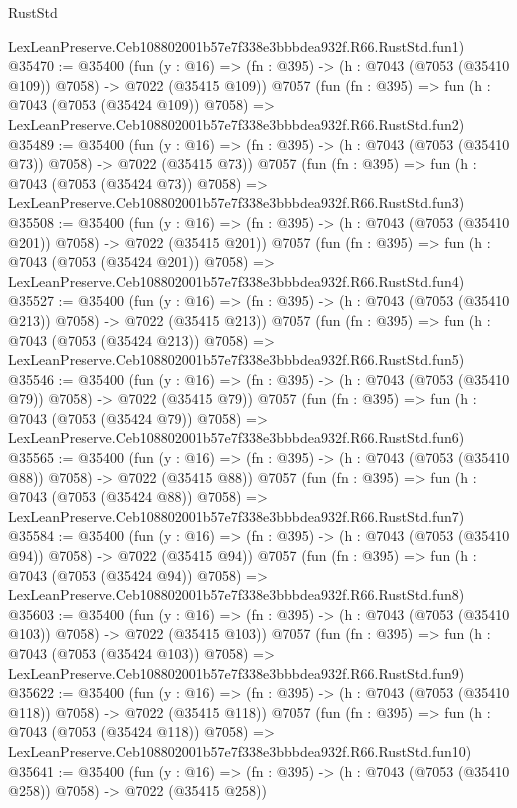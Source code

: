 \begin{lexlean}{RustStd}
\begin{coremodule}
    LexLeanPreserve.Ceb108802001b57e7f338e3bbbdea932f.R66.RustStd.fun1)
@35470 := @35400
    (fun (y : @16) => (fn : @395) -> (h : @7043 (@7053 (@35410 @109)) @7058) -> @7022 (@35415 @109))
    @7057
    (fun (fn : @395) =>
    fun (h : @7043 (@7053 (@35424 @109)) @7058) =>
    LexLeanPreserve.Ceb108802001b57e7f338e3bbbdea932f.R66.RustStd.fun2)
@35489 := @35400
    (fun (y : @16) => (fn : @395) -> (h : @7043 (@7053 (@35410 @73)) @7058) -> @7022 (@35415 @73))
    @7057
    (fun (fn : @395) =>
    fun (h : @7043 (@7053 (@35424 @73)) @7058) =>
    LexLeanPreserve.Ceb108802001b57e7f338e3bbbdea932f.R66.RustStd.fun3)
@35508 := @35400
    (fun (y : @16) => (fn : @395) -> (h : @7043 (@7053 (@35410 @201)) @7058) -> @7022 (@35415 @201))
    @7057
    (fun (fn : @395) =>
    fun (h : @7043 (@7053 (@35424 @201)) @7058) =>
    LexLeanPreserve.Ceb108802001b57e7f338e3bbbdea932f.R66.RustStd.fun4)
@35527 := @35400
    (fun (y : @16) => (fn : @395) -> (h : @7043 (@7053 (@35410 @213)) @7058) -> @7022 (@35415 @213))
    @7057
    (fun (fn : @395) =>
    fun (h : @7043 (@7053 (@35424 @213)) @7058) =>
    LexLeanPreserve.Ceb108802001b57e7f338e3bbbdea932f.R66.RustStd.fun5)
@35546 := @35400
    (fun (y : @16) => (fn : @395) -> (h : @7043 (@7053 (@35410 @79)) @7058) -> @7022 (@35415 @79))
    @7057
    (fun (fn : @395) =>
    fun (h : @7043 (@7053 (@35424 @79)) @7058) =>
    LexLeanPreserve.Ceb108802001b57e7f338e3bbbdea932f.R66.RustStd.fun6)
@35565 := @35400
    (fun (y : @16) => (fn : @395) -> (h : @7043 (@7053 (@35410 @88)) @7058) -> @7022 (@35415 @88))
    @7057
    (fun (fn : @395) =>
    fun (h : @7043 (@7053 (@35424 @88)) @7058) =>
    LexLeanPreserve.Ceb108802001b57e7f338e3bbbdea932f.R66.RustStd.fun7)
@35584 := @35400
    (fun (y : @16) => (fn : @395) -> (h : @7043 (@7053 (@35410 @94)) @7058) -> @7022 (@35415 @94))
    @7057
    (fun (fn : @395) =>
    fun (h : @7043 (@7053 (@35424 @94)) @7058) =>
    LexLeanPreserve.Ceb108802001b57e7f338e3bbbdea932f.R66.RustStd.fun8)
@35603 := @35400
    (fun (y : @16) => (fn : @395) -> (h : @7043 (@7053 (@35410 @103)) @7058) -> @7022 (@35415 @103))
    @7057
    (fun (fn : @395) =>
    fun (h : @7043 (@7053 (@35424 @103)) @7058) =>
    LexLeanPreserve.Ceb108802001b57e7f338e3bbbdea932f.R66.RustStd.fun9)
@35622 := @35400
    (fun (y : @16) => (fn : @395) -> (h : @7043 (@7053 (@35410 @118)) @7058) -> @7022 (@35415 @118))
    @7057
    (fun (fn : @395) =>
    fun (h : @7043 (@7053 (@35424 @118)) @7058) =>
    LexLeanPreserve.Ceb108802001b57e7f338e3bbbdea932f.R66.RustStd.fun10)
@35641 := @35400
    (fun (y : @16) => (fn : @395) -> (h : @7043 (@7053 (@35410 @258)) @7058) -> @7022 (@35415 @258))

\end{coremodule}
\end{lexlean}
